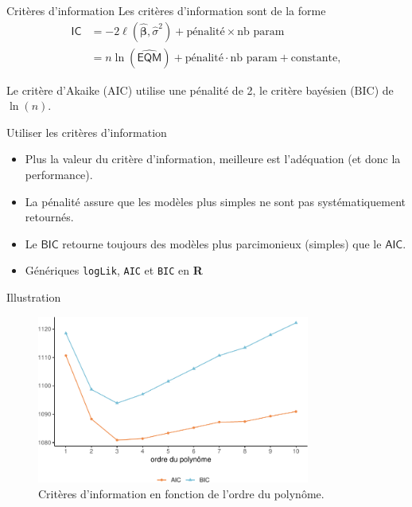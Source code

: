 \documentclass[
  ignorenonframetext,
]{beamer}
\providecommand{\tightlist}{%
  \setlength{\itemsep}{0pt}\setlength{\parskip}{0pt}}\usepackage{longtable,booktabs,array}
\begin{document}
\begin{frame}{Critères d'information}
\protect\hypertarget{crituxe8res-dinformation}{}
Les critères d'information sont de la forme \begin{align*}
\mathsf{IC} &=-2 \ell(\widehat{\boldsymbol{\beta}}, \widehat{\sigma}^2) +\text{pénalité}\times \text{nb param} \\&= n \ln (\widehat{\mathsf{EQM}}) +\text{pénalité}\cdot \text{nb param}+ \text{constante},
\end{align*}

Le critère d'Akaike (\(\text{AIC}\)) utilise une pénalité de 2, le
critère bayésien (\(\text{BIC}\)) de \(\ln(n)\).
\end{frame}

\begin{frame}[fragile]{Utiliser les critères d'information}
\protect\hypertarget{utiliser-les-crituxe8res-dinformation}{}
\begin{itemize}
\tightlist
\item
  Plus la valeur du critère d'information, meilleure est l'adéquation
  (et donc la performance).
\item
  La pénalité assure que les modèles plus simples ne sont pas
  systématiquement retournés.
\item
  Le \(\textsf{BIC}\) retourne toujours des modèles plus parcimonieux
  (simples) que le \(\textsf{AIC}\).
\item
  Génériques \texttt{logLik}, \texttt{AIC} et \texttt{BIC} en \textbf{R}
\end{itemize}
\end{frame}

\begin{frame}{Illustration}
\protect\hypertarget{illustration}{}
\begin{figure}

{\centering \includegraphics[width=0.8\textwidth,height=\textheight]{MATH60602-diapos4_files/figure-beamer/fig-polynome-ajustement-1.pdf}

}

\caption{\label{fig-polynome-ajustement}Critères d'information en
fonction de l'ordre du polynôme.}

\end{figure}
\end{frame}
\end{document}
